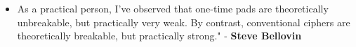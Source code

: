 \documentclass{article}
\begin{document}

\begin{itemize}
  \item As a practical person, I've observed that one-time pads are theoretically unbreakable, but practically very weak. By contrast, conventional ciphers are theoretically breakable, but practically strong." - \textbf{Steve Bellovin}
\end{itemize}
\end{document}
